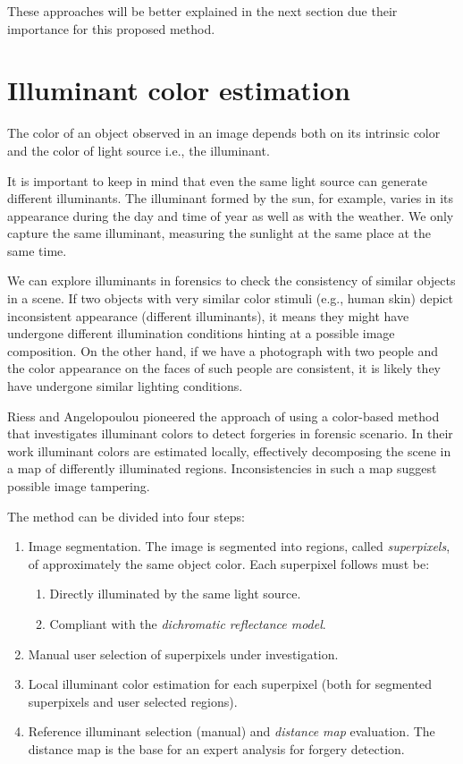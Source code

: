 These approaches will be better explained in the next section due their importance for this proposed method.

\section{Illuminant color estimation}


The color of an object observed in an image depends both on its intrinsic color and the color of light source i.e., the illuminant. 

It is important to keep in mind that even the same light source can generate different illuminants. The illuminant formed by the sun, for example, varies in its appearance during the day and time of year as well as with the weather. We only capture the same illuminant, measuring the sunlight at the same place at the same time.

We can explore illuminants in forensics to check the consistency of similar objects in a scene. If two objects with very similar color stimuli (e.g., human skin) depict inconsistent appearance (different illuminants), it means they might have undergone different illumination conditions hinting at a possible image composition. On the other hand, if we have a photograph with two people and the color appearance on the faces of such people are consistent, it is likely they have undergone similar lighting conditions.

Riess and Angelopoulou\cite{riess2010scene} pioneered the approach of using a color-based method that investigates illuminant colors to detect forgeries in forensic scenario. In their work illuminant colors are estimated locally, effectively decomposing the scene in a map of differently illuminated regions. Inconsistencies in such a map suggest possible image tampering.

The method can be divided into four steps:

\begin{enumerate}
\item Image segmentation. The image is segmented into regions, called \emph{superpixels}, of approximately the same object color. Each superpixel follows must be:
\begin{enumerate}
\item Directly illuminated by the same light source.
\item Compliant with the \emph{dichromatic reflectance model}\cite{tan2004color}.
\end{enumerate}
\item Manual user selection of superpixels under investigation.
\item Local illuminant color estimation for each superpixel (both for segmented superpixels and user selected regions).
\item Reference illuminant selection (manual) and \emph{distance map} evaluation. The distance map is the base for an expert analysis for forgery detection.
\end{enumerate}

